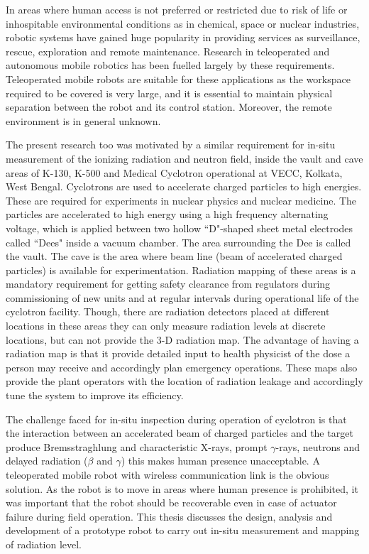 In areas where human access is not preferred or restricted  due to risk of life or inhospitable environmental conditions as in chemical, space or nuclear industries, robotic systems have gained huge popularity in providing services as surveillance, rescue, exploration and remote maintenance.  Research in teleoperated and autonomous mobile robotics has been fuelled largely by these  requirements. Teleoperated mobile robots are suitable for these applications  as the workspace required to be covered is very large, and it is essential to maintain  physical separation between the robot and its control station. Moreover, the remote environment is in general unknown. 
 
 The present research too was motivated by a similar requirement for in-situ measurement of the ionizing radiation and  neutron field, inside the vault and cave areas of   K-130,  K-500  and Medical Cyclotron operational at VECC, Kolkata, West Bengal. Cyclotrons are used to accelerate  charged particles to high energies. These are required for experiments in nuclear physics and nuclear medicine. The particles are accelerated to high energy using a high frequency alternating voltage, which is applied between two hollow ``D"-shaped sheet metal electrodes called ``Dees" inside a vacuum chamber. The area surrounding the Dee is called the vault.  The cave is the area where beam line (beam of  accelerated charged particles) is available for experimentation. Radiation mapping of these areas is a  mandatory requirement for getting safety clearance from regulators during  commissioning of new units and at regular intervals during operational life of the cyclotron facility.   Though, there are radiation detectors placed at different locations in these areas they can only measure radiation levels at discrete locations, but can not provide the 3-D radiation  map. The advantage of having a  radiation map is that it  provide detailed  input to health physicist  of the dose a person may receive and accordingly plan emergency  operations. These maps also provide the plant operators with the location of radiation leakage and accordingly tune the system to improve its efficiency.

The challenge faced for in-situ inspection during operation of cyclotron is that the interaction  between  an  accelerated  beam   of  charged  particles  and  the  target  produce Bremsstraghlung and characteristic X-rays, prompt $\gamma$-rays, neutrons and delayed radiation ($\beta $ and $\gamma$) this makes human presence unacceptable.  A teleoperated mobile robot with wireless communication link is the obvious solution. As the robot is to move in areas where human presence is prohibited, it was important that the robot should be recoverable even in case of actuator failure during field operation.  This thesis discusses the design, analysis and development of a prototype robot  to carry out in-situ measurement and mapping of radiation level.


